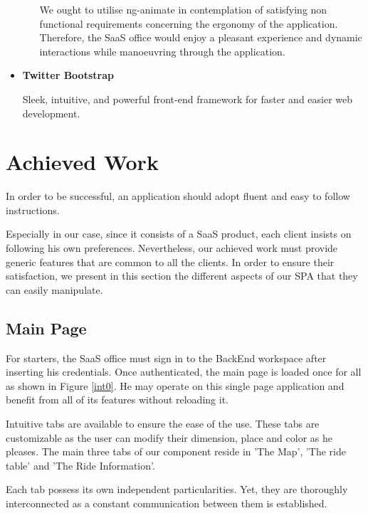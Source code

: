 \begin{itemize}
\begin{itemize}[label=]
We ought to utilise ng-animate in contemplation of satisfying non functional requirements concerning the ergonomy of the application. 
Therefore, the SaaS office would enjoy a pleasant experience and dynamic interactions while manoeuvring through the application. 

\end{itemize}

\item \textbf{Twitter Bootstrap } 

Sleek, intuitive, and powerful front-end framework for faster and easier web development.

\end{itemize}


\section{Achieved Work}

In order to be successful, an application should adopt fluent and easy to follow instructions.

Especially in our case, since it consists of a SaaS product, each client insists on following his own preferences. Nevertheless, our achieved work must provide generic features that are common to all the clients. In order to ensure their satisfaction, we present in this section the different aspects of our SPA that they can easily manipulate.

\subsection{Main Page }

For starters, the SaaS office must sign in to the BackEnd workspace after inserting his credentials. Once authenticated, the main page is loaded once for all as shown in Figure \ref{int0}. He may operate on this single page application and benefit from all of its features without reloading it.

Intuitive tabs are available to ensure the ease of the use. These tabs are customizable as the user can modify their dimension, place and color as he pleases. 
The main three tabs of our component reside in 'The Map', 'The ride table' and 'The Ride Information'.

Each tab possess its own independent particularities. Yet, they are thoroughly interconnected as a constant communication between them is established.



